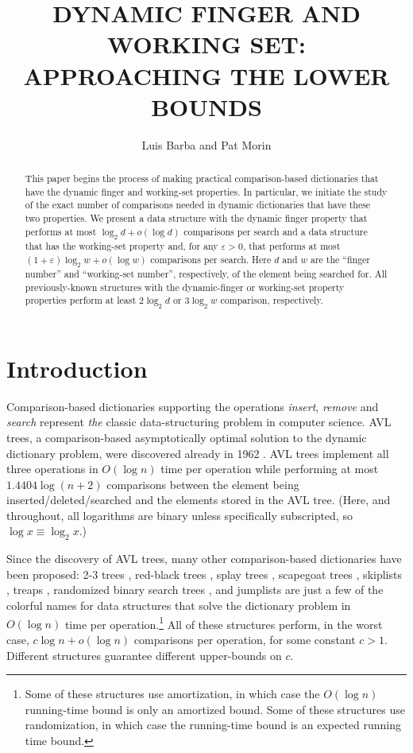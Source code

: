 \documentclass{patmorin}
\title{\MakeUppercase{Dynamic Finger and Working Set: Approaching the Lower Bounds}}
\author{Luis Barba and Pat Morin}
\newcommand{\eps}{\varepsilon}
\begin{document}
\begin{titlepage}
\maketitle

\begin{abstract}
  This paper begins the process of making practical comparison-based
  dictionaries that have the dynamic finger and working-set properties.
  In particular, we initiate the study of the exact number of comparisons
  needed in dynamic dictionaries that have these two properties.  We
  present a data structure with the dynamic finger property that performs
  at most $\log_2 d+o(\log d)$ comparisons per search and a data structure
  that has the working-set property and, for any $\eps > 0$, that
  performs at most $(1+\eps)\log_2 w+o(\log w)$ comparisons per search.
  Here $d$ and $w$ are the ``finger number'' and ``working-set number'',
  respectively, of the element being searched for.  All previously-known
  structures with the dynamic-finger or working-set property properties
  perform at least $2\log_2 d$ or $3\log_2 w$ comparison, respectively.
\end{abstract}

\end{titlepage}

\section{Introduction}

Comparison-based dictionaries supporting the operations
\emph{insert}, \emph{remove} and \emph{search} represent \emph{the}
classic data-structuring problem in computer science.  AVL trees, a
comparison-based asymptotically optimal solution to the dynamic dictionary
problem, were discovered already in 1962 \cite{adelsson.vleski.ea:blah}.
AVL trees implement all three operations in $O(\log n)$ time per operation
while performing at most $1.4404\log(n+2)$ comparisons between the element
being inserted/deleted/searched and the elements stored in the AVL tree.
(Here, and throughout, all logarithms are binary unless specifically
subscripted, so $\log x \equiv \log_2 x$.)

Since the discovery of AVL trees, many other comparison-based
dictionaries have been proposed: 2-3 trees \cite{X}, red-black trees
\cite{X}, splay trees \cite{X}, scapegoat trees \cite{X, Y}, skiplists
\cite{X}, treaps \cite{X,Y}, randomized binary search trees \cite{X},
and jumplists \cite{X} are just a few of the colorful names for data
structures that solve the dictionary problem in $O(\log n)$ time
per operation.\footnote{Some of these structures use amortization,
in which case the $O(\log n)$ running-time bound is only an amortized
bound.  Some of these structures use randomization, in which case the
running-time bound is an expected running time bound.}  All of these
structures perform, in the worst case, $c\log n + o(\log n)$ comparisons
per operation, for some constant $c>1$. Different structures guarantee
different upper-bounds on $c$.
\end{document}

